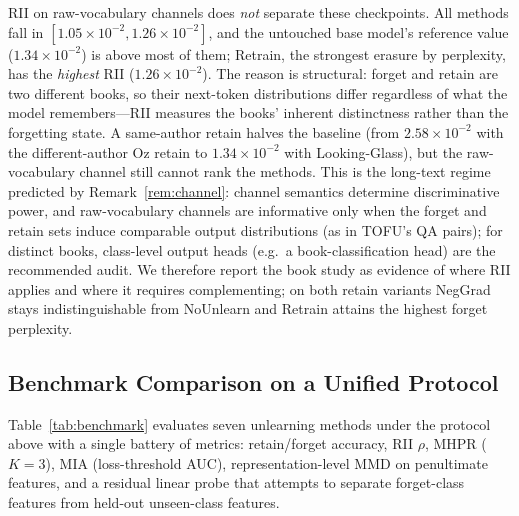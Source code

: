 \documentclass[smallextended]{svjour3}       %
\begin{document}
RII on raw-vocabulary channels does \emph{not} separate these checkpoints. All methods fall in $[1.05{\times}10^{-2}, 1.26{\times}10^{-2}]$, and the untouched base model's reference value ($1.34{\times}10^{-2}$) is above most of them; Retrain, the strongest erasure by perplexity, has the \emph{highest} RII ($1.26{\times}10^{-2}$). The reason is structural: forget and retain are two different books, so their next-token distributions differ regardless of what the model remembers---RII measures the books' inherent distinctness rather than the forgetting state. A same-author retain halves the baseline (from $2.58{\times}10^{-2}$ with the different-author Oz retain to $1.34{\times}10^{-2}$ with Looking-Glass), but the raw-vocabulary channel still cannot rank the methods. This is the long-text regime predicted by Remark~\ref{rem:channel}: channel semantics determine discriminative power, and raw-vocabulary channels are informative only when the forget and retain sets induce comparable output distributions (as in TOFU's QA pairs); for distinct books, class-level output heads (e.g.\ a book-classification head) are the recommended audit. We therefore report the book study as evidence of where RII applies and where it requires complementing; on both retain variants NegGrad stays indistinguishable from NoUnlearn and Retrain attains the highest forget perplexity.

\subsection{Benchmark Comparison on a Unified Protocol}
\label{sec:benchmark}

Table~\ref{tab:benchmark} evaluates seven unlearning methods under the protocol above with a single battery of metrics: retain/forget accuracy, RII $\rho$, MHPR ($K{=}3$), MIA (loss-threshold AUC), representation-level MMD on penultimate features, and a residual linear probe that attempts to separate forget-class features from held-out unseen-class features.
\end{document}
